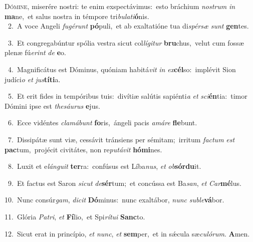 \lettrine{\initial\textcolor{\initialcolor}{D}}{ómine,} miserére nostri: te enim exspectávimus:~\dagger esto bráchium \textit{nos}\-\textit{trum} \textit{in} \textbf{ma}\-ne,~\star et salus nostra in témpore tri\-\textit{bu}\-\textit{la}\textit{ti}\textbf{ó}nis.\\
{\numbfont\textcolor{\numbcolor}{~2.}}~A voce Angeli \textit{fu}\-\textit{gé}\textit{runt} \textbf{pó}\-puli,~\star et ab exaltatióne tua di\-\textit{spér}\-\textit{sæ} \textit{sunt} \textbf{gen}\-tes.\par
{\numbfont\textcolor{\numbcolor}{~3.}}~Et congregabúntur spólia vestra sicut col\-\textit{lí}\-\textit{gi}\textit{tur} \textbf{bru}\-chus,~\star velut cum fossæ plenæ fú\-\textit{e}\-\textit{rint} \textit{de} \textbf{e}\-o.\par
{\numbfont\textcolor{\numbcolor}{~4.}}~Magnificátus est Dóminus, quóniam habitá\textit{vit} \textit{in} \textit{ex}\-\textbf{cél}so:~\star implévit Sion judíci\textit{o} \textit{et} \textit{jus}\-\textbf{tí}\textbf{ti}a.\par
{\numbfont\textcolor{\numbcolor}{~5.}}~Et erit fides in tempóribus tuis:~\dagger divítiæ salútis sapiénti\textit{a} \textit{et} \textit{sci}\-\textbf{én}tia:~\star timor Dómini ipse est \textit{the}\-\textit{sáu}\textit{rus} \textbf{e}\-jus.\par
{\numbfont\textcolor{\numbcolor}{~6.}}~Ecce vidéntes \textit{cla}\-\textit{má}\textit{bunt} \textbf{fo}\-ris,~\star ángeli pacis \textit{a}\-\textit{má}\textit{re} \textbf{fle}\-bunt.\par
{\numbfont\textcolor{\numbcolor}{~7.}}~Dissipátæ sunt viæ, cessávit tránsiens per sémitam;~\dagger irritum \textit{fac}\-\textit{tum} \textit{est} \textbf{pac}\-tum,~\star projécit civitátes, non re\-\textit{pu}\-\textit{tá}\textit{vit} \textbf{hó}\-\textbf{mi}nes.\par
{\numbfont\textcolor{\numbcolor}{~8.}}~Luxit et e\-\textit{lán}\-\textit{gu}\textit{it} \textbf{ter}\-ra:~\star confúsus est Líba\-\textit{nus}\-, \textit{et} \textit{ob}\-\textbf{sór}\textbf{du}it.\par
{\numbfont\textcolor{\numbcolor}{~9.}}~Et factus est Saron \textit{sic}\-\textit{ut} \textit{de}\-\textbf{sér}tum;~\star et concússa est Ba\-\textit{san}\-, \textit{et} \textit{Car}\-\textbf{mé}lus.\par
{\numbfont\textcolor{\numbcolor}{10.}}~Nunc consúr\-\textit{gam}\-, \textit{di}\-\textit{cit} \textbf{Dó}\-minus:~\star nunc exaltábor, \textit{nunc} \textit{sub}\-\textit{le}\textbf{vá}bor.\par
{\numbfont\textcolor{\numbcolor}{11.}}~Glória \textit{Pa}\-\textit{tri}, \textit{et} \textbf{Fí}\-lio,~\star et Spi\-\textit{rí}\-\textit{tu}\textit{i} \textbf{Sanc}\-to.\par
{\numbfont\textcolor{\numbcolor}{12.}}~Sicut erat in princípio, \textit{et} \textit{nunc}\-, \textit{et} \textbf{sem}\-per,~\star et in sǽcula sæ\-\textit{cu}\-\textit{ló}\textit{rum}. \textbf{A}\-men.\par
